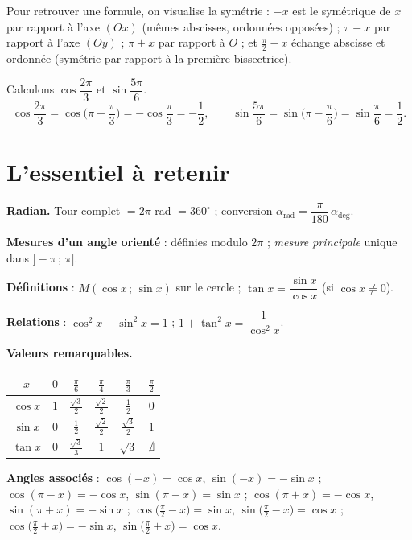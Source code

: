 \begin{remarque}
Pour retrouver une formule, on visualise la symétrie : $-x$ est le symétrique de
$x$ par rapport à l'axe $(Ox)$ (mêmes abscisses, ordonnées opposées) ; $\pi-x$ par
rapport à l'axe $(Oy)$ ; $\pi+x$ par rapport à $O$ ; et $\tfrac{\pi}{2}-x$ échange
abscisse et ordonnée (symétrie par rapport à la première bissectrice).
\end{remarque}

\begin{exemple}
Calculons $\cos\dfrac{2\pi}{3}$ et $\sin\dfrac{5\pi}{6}$.
\[ \cos\frac{2\pi}{3}=\cos\Big(\pi-\frac{\pi}{3}\Big)=-\cos\frac{\pi}{3}=-\frac12,
   \qquad
   \sin\frac{5\pi}{6}=\sin\Big(\pi-\frac{\pi}{6}\Big)=\sin\frac{\pi}{6}=\frac12. \]
\end{exemple}

\section{L'essentiel à retenir}

\begin{synthese}
\textbf{Radian.} Tour complet $=2\pi$ rad $=360^\circ$ ; conversion
$\alpha_{\mathrm{rad}}=\dfrac{\pi}{180}\,\alpha_{\deg}$.

\smallskip
\textbf{Mesures d'un angle orienté} : définies modulo $2\pi$ ; \emph{mesure
principale} unique dans $]-\pi\,;\,\pi]$.

\smallskip
\textbf{Définitions} : $M(\cos x\,;\,\sin x)$ sur le cercle ;
$\tan x=\dfrac{\sin x}{\cos x}$ (si $\cos x\neq 0$).

\smallskip
\textbf{Relations} : $\cos^2 x+\sin^2 x=1$ ; $1+\tan^2 x=\dfrac{1}{\cos^2 x}$.

\smallskip
\textbf{Valeurs remarquables.}
\renewcommand{\arraystretch}{1.5}
\begin{center}\color{white}
\begin{tabular}{@{}c|ccccc@{}}
\toprule
$x$ & $0$ & $\frac{\pi}{6}$ & $\frac{\pi}{4}$ & $\frac{\pi}{3}$ & $\frac{\pi}{2}$ \\
\midrule
$\cos x$ & $1$ & $\frac{\sqrt3}{2}$ & $\frac{\sqrt2}{2}$ & $\frac12$ & $0$ \\
$\sin x$ & $0$ & $\frac12$ & $\frac{\sqrt2}{2}$ & $\frac{\sqrt3}{2}$ & $1$ \\
$\tan x$ & $0$ & $\frac{\sqrt3}{3}$ & $1$ & $\sqrt3$ & $\nexists$ \\
\bottomrule
\end{tabular}
\end{center}

\smallskip
\textbf{Angles associés} : $\cos(-x)=\cos x$, $\sin(-x)=-\sin x$ ;
$\cos(\pi-x)=-\cos x$, $\sin(\pi-x)=\sin x$ ;
$\cos(\pi+x)=-\cos x$, $\sin(\pi+x)=-\sin x$ ;
$\cos\!\big(\tfrac{\pi}{2}-x\big)=\sin x$, $\sin\!\big(\tfrac{\pi}{2}-x\big)=\cos x$ ;
$\cos\!\big(\tfrac{\pi}{2}+x\big)=-\sin x$, $\sin\!\big(\tfrac{\pi}{2}+x\big)=\cos x$.
\end{synthese}

